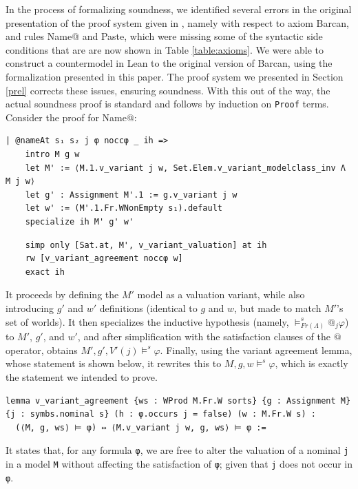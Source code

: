 \documentclass{easychair}
\theoremstyle{remark}
\begin{document}
In the process of formalizing soundness, we identified several errors in the original presentation of the proof system given in \cite{tableaux}, namely with respect to axiom Barcan, and rules Name@ and Paste, which were missing some of the syntactic side conditions that are are now shown in Table \ref{table:axioms}. We were able to construct a countermodel in Lean to the original version of Barcan, using the formalization presented in this paper. The proof system we presented in Section \ref{prel} corrects these issues, ensuring soundness. With this out of the way, the actual soundness proof is standard and follows by induction on \lstinline{Proof} terms. Consider the proof for Name@:
\begin{lstlisting}
| @nameAt s₁ s₂ j φ noccφ _ ih =>
    intro M g w
    let M' := ⟨M.1.v_variant j w, Set.Elem.v_variant_modelclass_inv Λ M j w⟩
    let g' : Assignment M'.1 := g.v_variant j w
    let w' := (M'.1.Fr.WNonEmpty s₁).default
    specialize ih M' g' w'
\end{lstlisting}
\vspace{-5mm}
\begin{lstlisting}
    simp only [Sat.at, M', v_variant_valuation] at ih
    rw [v_variant_agreement noccφ w]
    exact ih
\end{lstlisting}

It proceeds by defining the $M'$ model as a valuation variant, while also introducing $g'$ and $w'$ definitions (identical to $g$ and $w$, but made to match $M'$'s set of worlds). It then specializes the inductive hypothesis (namely, $\vDash^s_{Fr(\Lambda)} @_j \varphi$) to $M'$, $g'$, and $w'$, and after simplification with the satisfaction clauses of the $@$ operator, obtains $M', g', V'(j) \vDash^s \varphi$. Finally, using the variant agreement lemma, whose statement is shown below, it rewrites this to $M, g, w \vDash^s \varphi$, which is exactly the statement we intended to prove.

\begin{lstlisting}
lemma v_variant_agreement {ws : WProd M.Fr.W sorts} {g : Assignment M} {j : symbs.nominal s} (h : φ.occurs j = false) (w : M.Fr.W s) :
  (⟨M, g, ws⟩ ⊨ φ) ↔ ⟨M.v_variant j w, g, ws⟩ ⊨ φ :=
\end{lstlisting}

It states that, for any formula \lstinline{φ}, we are free to alter the valuation of a nominal \lstinline{j} in a model \lstinline{M} without affecting the satisfaction of \lstinline{φ}; given that \lstinline{j} does not occur in \lstinline{φ}.
\end{document}
